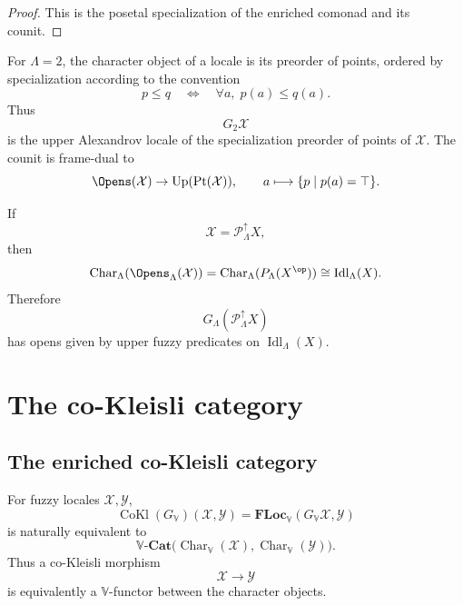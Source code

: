 \begin{proof}
This is the posetal specialization of the enriched comonad and its counit.
\end{proof}

\begin{example}
\label{ex:crisp-character-comonad}
For \(\Lambda=2\), the character object of a locale is its preorder of points,
ordered by specialization according to the convention
\[
    p\leq q
    \quad\Longleftrightarrow\quad
    \forall a,\;p(a)\leq q(a).
\]
Thus
\[
    G_2\mathcal X
\]
is the upper Alexandrov locale of the specialization preorder of points of
\(\mathcal X\).  The counit is frame-dual to
\[
    \Opens(\mathcal X)
    \to
    \operatorname{Up}(\operatorname{Pt}(\mathcal X)),
    \qquad
    a\longmapsto \{p\mid p(a)=\top\}.
\]
\end{example}

\begin{example}
\label{ex:presheaf-fuzzy-locale-character-comonad}
If
\[
    \mathcal X=\mathcal P_\Lambda^{\uparrow}X,
\]
then
\[
    \operatorname{Char}_\Lambda(\Opens_\Lambda(\mathcal X))
    =
    \operatorname{Char}_\Lambda(P_\Lambda(X^{\op}))
    \cong
    \operatorname{Idl}_\Lambda(X).
\]
Therefore
\[
    G_\Lambda(\mathcal P_\Lambda^{\uparrow}X)
\]
has opens given by upper fuzzy predicates on
\(\operatorname{Idl}_\Lambda(X)\).
\end{example}

\section{The co-Kleisli category}
\label{sec:cokleisli-character-comonad}

\subsection{The enriched co-Kleisli category}
\label{subsec:cokleisli-enriched}

\begin{theorem}
\label{thm:cokleisli-morphisms-enriched}
For fuzzy locales \(\mathcal X,\mathcal Y\),
\[
    \operatorname{CoKl}(G_{\mathbb V})(\mathcal X,\mathcal Y)
    =
    \mathbf{FLoc}_{\mathbb V}(G_{\mathbb V}\mathcal X,\mathcal Y)
\]
is naturally equivalent to
\[
    \mathbb V\text{-}\mathbf{Cat}
    \bigl(
        \operatorname{Char}_{\mathbb V}(\mathcal X),
        \operatorname{Char}_{\mathbb V}(\mathcal Y)
    \bigr).
\]
Thus a co-Kleisli morphism
\[
    \mathcal X\to\mathcal Y
\]
is equivalently a \(\mathbb V\)-functor between the character objects.
\end{theorem}

